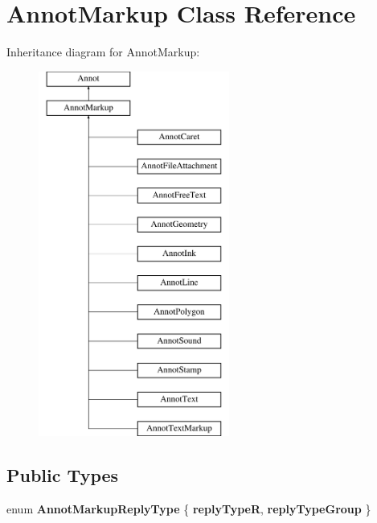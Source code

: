 \hypertarget{class_annot_markup}{}\section{Annot\+Markup Class Reference}
\label{class_annot_markup}
Inheritance diagram for Annot\+Markup\+:\begin{figure}[H]
\begin{center}
\leavevmode
\includegraphics[height=12.000000cm]{class_annot_markup}
\end{center}
\end{figure}
\subsection*{Public Types}
\begin{DoxyCompactItemize}
\item 
\mbox{\label{class_annot_markup_a2aa2956a7e85f755c6962c7f3de67a07}} 
enum {\bfseries Annot\+Markup\+Reply\+Type} \{ {\bfseries reply\+TypeR}, 
{\bfseries reply\+Type\+Group}
 \}
\end{DoxyCompactItemize}
